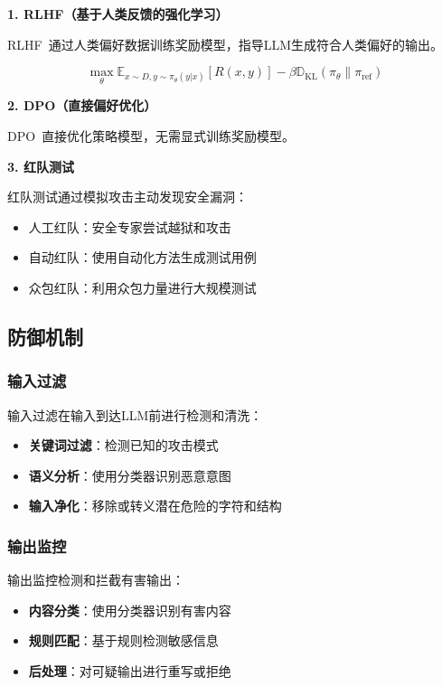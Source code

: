 \textbf{1. RLHF（基于人类反馈的强化学习）}

RLHF~\cite{ouyang2022training}通过人类偏好数据训练奖励模型，指导LLM生成符合人类偏好的输出。

\begin{equation}
    \max_{\theta} \mathbb{E}_{x \sim D, y \sim \pi_{\theta}(y|x)} [R(x, y)] - \beta \mathbb{D}_{\text{KL}}(\pi_{\theta} \| \pi_{\text{ref}})
\end{equation}

\textbf{2. DPO（直接偏好优化）}

DPO~\cite{rafailov2023direct}直接优化策略模型，无需显式训练奖励模型。

\textbf{3. 红队测试}

红队测试通过模拟攻击主动发现安全漏洞：
\begin{itemize}[leftmargin=2em]
    \item 人工红队：安全专家尝试越狱和攻击
    \item 自动红队：使用自动化方法生成测试用例
    \item 众包红队：利用众包力量进行大规模测试
\end{itemize}

\subsection{防御机制}

\subsubsection{输入过滤}

输入过滤在输入到达LLM前进行检测和清洗：

\begin{itemize}[leftmargin=2em]
    \item \textbf{关键词过滤}：检测已知的攻击模式
    \item \textbf{语义分析}：使用分类器识别恶意意图
    \item \textbf{输入净化}：移除或转义潜在危险的字符和结构
\end{itemize}

\subsubsection{输出监控}

输出监控检测和拦截有害输出：

\begin{itemize}[leftmargin=2em]
    \item \textbf{内容分类}：使用分类器识别有害内容
    \item \textbf{规则匹配}：基于规则检测敏感信息
    \item \textbf{后处理}：对可疑输出进行重写或拒绝
\end{itemize}

